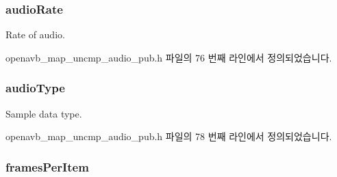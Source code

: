 \subsubsection[{\texorpdfstring{audio\+Rate}{audioRate}}]{ audio\+Rate}\hypertarget{structmedia__q__pub__map__uncmp__audio__info__t_a98636b12c3c9cafdc6992d03d6f86852}{}\label{structmedia__q__pub__map__uncmp__audio__info__t_a98636b12c3c9cafdc6992d03d6f86852}


Rate of audio. 



openavb\+\_\+map\+\_\+uncmp\+\_\+audio\+\_\+pub.\+h 파일의 76 번째 라인에서 정의되었습니다.

\subsubsection[{\texorpdfstring{audio\+Type}{audioType}}]{ audio\+Type}\hypertarget{structmedia__q__pub__map__uncmp__audio__info__t_abc6ed39d478764b05a886d64d104ce4b}{}\label{structmedia__q__pub__map__uncmp__audio__info__t_abc6ed39d478764b05a886d64d104ce4b}


Sample data type. 



openavb\+\_\+map\+\_\+uncmp\+\_\+audio\+\_\+pub.\+h 파일의 78 번째 라인에서 정의되었습니다.

\subsubsection[{\texorpdfstring{frames\+Per\+Item}{framesPerItem}}]{ frames\+Per\+Item}\hypertarget{structmedia__q__pub__map__uncmp__audio__info__t_a584c8e40420ea0739971d02cefc8dd93}{}\label{structmedia__q__pub__map__uncmp__audio__info__t_a584c8e40420ea0739971d02cefc8dd93}


